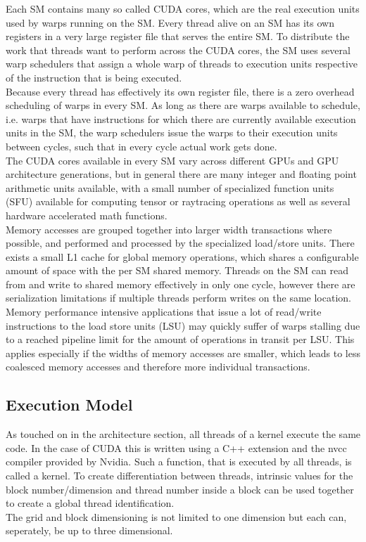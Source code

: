 \documentclass{tudscrreprt}
\begin{document}
				Each SM contains many so called CUDA cores, which are the real execution units used by warps running on the SM. Every thread alive on an SM has its own registers in a very large register file that serves the entire SM. To distribute the work that threads want to perform across the CUDA cores, the SM uses several warp schedulers that assign a whole warp of threads to execution units respective of the instruction that is being executed. \\
				Because every thread has effectively its own register file, there is a zero overhead scheduling of warps in every SM. As long as there are warps available to schedule, i.e. warps that have instructions for which there are currently available execution units in the SM, the warp schedulers issue the warps to their execution units between cycles, such that in every cycle actual work gets done. \\
				
				The CUDA cores available in every SM vary across different GPUs and GPU architecture generations, but in general there are many integer and floating point arithmetic units available, with a small number of specialized function units (SFU) available for computing tensor or raytracing operations as well as several hardware accelerated math functions. \\
				
				Memory accesses are grouped together into larger width transactions where possible, and performed and processed by the specialized load/store units. There exists a small L1 cache for global memory operations, which shares a configurable amount of space with the per SM shared memory. Threads on the SM can read from and write to shared memory effectively in only one cycle, however there are serialization limitations if multiple threads perform writes on the same location. \\
				Memory performance intensive applications that issue a lot of read/write instructions to the load store units (LSU) may quickly suffer of warps stalling due to a reached pipeline limit for the amount of operations in transit per LSU. This applies especially if the widths of memory accesses are smaller, which leads to less coalesced memory accesses and therefore more individual transactions. \cite{cuda_memorycoalescing} \\
			
			\subsection{Execution Model}
				\label{sec:gpu_execution_model}
				As touched on in the architecture section, all threads of a kernel execute the same code. In the case of CUDA this is written using a C++ extension and the nvcc compiler provided by Nvidia. Such a function, that is executed by all threads, is called a kernel. To create differentiation between threads, intrinsic values for the block number/dimension and thread number inside a block can be used together to create a global thread identification. \\
				The grid and block dimensioning is not limited to one dimension but each can, seperately, be up to three dimensional. \\
				
\end{document}
